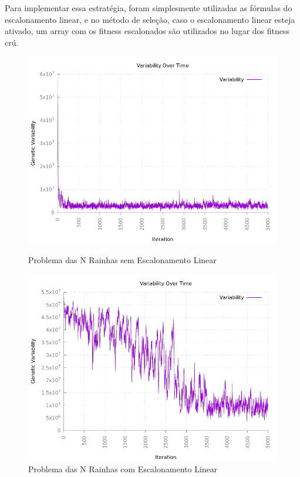 \documentclass[12pt]{article}
\begin{document}
Para implementar essa estratégia, foram simplesmente utilizadas as fórmulas do 
escalonamento linear, e no método de seleção, caso o escalonamento linear esteja ativado, 
um array com os fitness escalonados são utilizados no lugar dos fitness crú.

\begin{figure}[h!]
    \centering
    \begin{minipage}{0.47\textwidth}
        \centering
        \includegraphics[width=\textwidth]{pictures/queensvarscalingoff}
        \caption{Problema das N Rainhas sem Escalonamento Linear}
        \label{f310}
    \end{minipage}
    \begin{minipage}{0.47\textwidth}
        \centering
        \includegraphics[width=\textwidth]{pictures/64queensvariabilityscalingon}
        \caption{Problema das N Rainhas com Escalonamento Linear}
        \label{linscaling}
    \end{minipage}
\end{figure}
\end{document}
